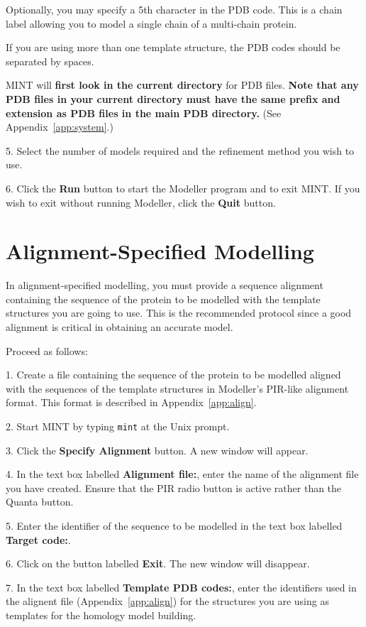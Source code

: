 \documentclass[12pt]{article}
\begin{document}
Optionally, you may specify a 5th character in the PDB code. This is a
chain label allowing you to model a single chain of a multi-chain protein.

If you are using more than one template structure, the PDB codes
should be separated by spaces.

MINT will {\bfseries first look in the current directory} for PDB
files. {\bfseries Note that any PDB files in your current directory
must have the same prefix and extension as PDB files in the main PDB
directory.} (See Appendix~\ref{app:system}.)

5. Select the number of models required and the refinement method you
wish to use.

6. Click the {\bfseries Run} button to start the Modeller program and to exit
MINT. If you wish to exit without running Modeller, click the {\bfseries Quit}
button. 


\section{Alignment-Specified Modelling}
In alignment-specified modelling, you must provide a sequence
alignment containing the sequence of the protein to be modelled with
the template structures you are going to use. This is the recommended
protocol since a good alignment is critical in obtaining an accurate
model. 
\vspace{1em}

\noindent Proceed as follows:

1. Create a file containing the sequence of the protein to be modelled
aligned with the sequences of the template structures in Modeller's
PIR-like alignment format. This format is described in
Appendix~\ref{app:align}.

2. Start MINT by typing {\tt mint} at the Unix prompt.

3. Click the {\bfseries Specify Alignment} button. A new window will
appear.

4. In the text box labelled {\bfseries Alignment file:}, enter the
name of the alignment file you have created. Ensure that the PIR radio
button is active rather than the Quanta button.

5. Enter the identifier of the sequence to be modelled in the text box
labelled {\bfseries Target code:}.

6. Click on the button labelled {\bfseries Exit}. The new window will
disappear.

7. In the text box labelled {\bfseries Template PDB codes:}, enter the
identifiers used in the alignent file (Appendix~\ref{app:align}) for
the structures you are using as templates for the homology model
building.
\end{document}
